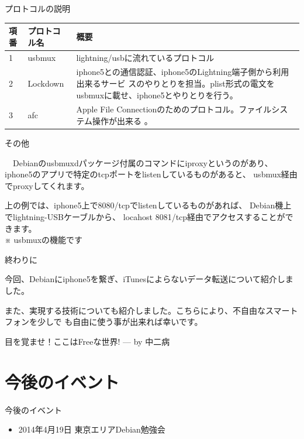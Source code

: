 \begin{frame}{プロトコルの説明}

\begin{table}[ht]
\begin{center}
\begin{tabular}{|l|l|p{7cm}|}
\hline 
項番 & プロトコル名 & 概要 \\ \hline
1 & usbmux & lightning/usbに流れているプロトコル\\ \hline
2 & Lockdown & iphone5との通信認証、iphone5のLightning端子側から利用出来るサービ
スのやりとりを担当。plist形式の電文をusbmuxに載せ、iphone5とやりとりを行う。 \\ 
\hline
3 & afc & Apple File Connectionのためのプロトコル。ファイルシステム操作が出来る
。\\ \hline
\end{tabular}
\end{center}
\end{table}

\end{frame}

\begin{frame}[containsverbatim]{その他}

　Debianのusbmuxdパッケージ付属のコマンドにiproxyというのがあり、
iphone5のアプリで特定のtcpポートをlistenしているものがあると、
usbmux経由でproxyしてくれます。
上の例では、iphone5上で8080/tcpでlistenしているものがあれば、
Debian機上でlightning-USBケーブルから、
locahost 8081/tcp経由でアクセスすることができます。\\
※ usbmuxの機能です
\end{frame}

\begin{frame}{終わりに}

 今回、Debianにiphone5を繋ぎ、iTunesによらないデータ転送について紹介しました。

 また、実現する技術についても紹介しました。こちらにより、不自由なスマートフォンを少しで
も自由に使う事が出来れば幸いです。

\begin{center} 
\LARGE 目を覚ませ！ここはFreeな世界! --- by 中二病
\end{center}

\end{frame}

\section{今後のイベント}
\begin{frame}{今後のイベント}
\begin{itemize}
 \item 2014年4月19日 東京エリアDebian勉強会
\end{itemize}
\end{frame}

